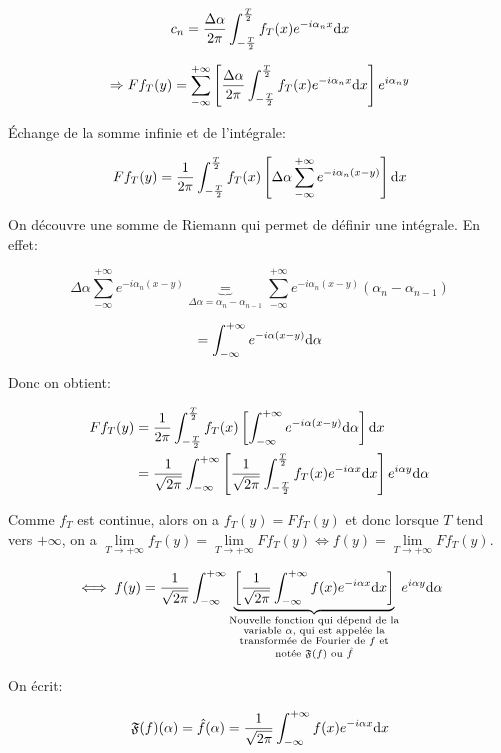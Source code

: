 \[
c_n =
\frac{\Delta \alpha}{2 \pi}
\int_{-\frac{T}{2}}^{\frac{T}{2}} f_T(x) e^{-i \alpha_n x} \mathrm{d}x
\]

\[
\Rightarrow
F f_T(y) =
\sum_{-\infty}^{+\infty}
\left[
\frac{\Delta \alpha}{2 \pi}
\int_{-\frac{T}{2}}^{\frac{T}{2}}
f_T(x) e^{-i \alpha_n x} \mathrm{d}x
\right]
e^{i \alpha_n y}
\]

Échange de la somme infinie et de l'intégrale:

\[
F f_T(y) =
\frac{1}{2 \pi}
\int_{-\frac{T}{2}}^{\frac{T}{2}}
f_T(x)
\left[
\Delta \alpha
\sum_{-\infty}^{+\infty}
e^{-i \alpha_n (x - y)}
\right]
\mathrm{d}x
\]

On découvre une somme de Riemann qui permet de définir une intégrale.
En effet:

\[
\Delta \alpha \sum_{-\infty}^{+\infty}
e^{-i \alpha_n (x - y)}
\underbrace{=}_{\Delta\alpha = \alpha_n - \alpha_{n - 1}}
\sum_{-\infty}^{+\infty}
e^{-i \alpha_n (x - y)} (\alpha_n - \alpha_{n - 1})
\]

\[
=
\int_{-\infty}^{+\infty}
e^{-i \alpha (x - y)}
\mathrm{d}\alpha
\]

Donc on obtient:

\begin{align*}
F f_T(y) &=
\frac{1}{2 \pi}
\int_{-\frac{T}{2}}^{\frac{T}{2}}
f_T(x)
\left[
\int_{-\infty}^{+\infty}
e^{-i \alpha (x - y)}
\mathrm{d}\alpha
\right]
\mathrm{d}x
\\&=
\frac{1}{\sqrt{2 \pi}}
\int_{-\infty}^{+\infty}
\left[
\frac{1}{\sqrt{2 \pi}}
\int_{-\frac{T}{2}}^{\frac{T}{2}}
f_T(x) e^{-i \alpha x}
\mathrm{d}x
\right]
e^{i \alpha y}
\mathrm{d}\alpha
\end{align*}

Comme $f_T$ est continue, alors on a $f_T(y) = F f_T(y)$ et donc lorsque $T$ tend vers $+\infty$, on a
$\lim\limits_{T \rightarrow +\infty} f_T(y) =
\lim\limits_{T \rightarrow +\infty} F f_T(y) \iff
f(y) = \lim\limits_{T \rightarrow +\infty} F f_T(y)$.

\[
\iff
f(y) =
\frac{1}{\sqrt{2 \pi}}
\int_{-\infty}^{+\infty}
\underbrace{
\left[
\frac{1}{\sqrt{2 \pi}}
\int_{-\infty}^{+\infty}
f(x) e^{-i \alpha x}
\mathrm{d}x
\right]
}_{\substack{
\textrm{Nouvelle fonction qui dépend de la}\\
\textrm{variable $\alpha$, qui est appelée la}\\
\textrm{transformée de Fourier de $f$ et}\\
\textrm{notée $\mathfrak{F}(f)$ ou $\hat{f}$}
}}
e^{i \alpha y}
\mathrm{d}\alpha
\]

On écrit:

\[
\mathfrak{F}(f)(\alpha) = \hat{f}(\alpha) =
\frac{1}{\sqrt{2 \pi}}
\int_{-\infty}^{+\infty}
f(x) e^{-i \alpha x}
\mathrm{d}x
\]


